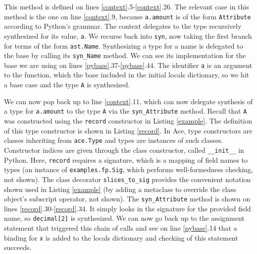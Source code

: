 {%

This method is defined on lines \ref{context}.5-\ref{context}.26. The relevant case in this method is the one on line \ref{context}.9, because \verb|a.amount| is of the form \verb|Attribute| according to Python's grammar. The context delegates to the type recursively synthesized for its value, \verb|a|. We recurse back into \verb|syn|, now taking the first branch for terms of the form \verb|ast.Name|. Synthesizing a type for a name is delegated to the base by calling its \verb|syn_Name| method. We can see its implementation for the base we are using on lines \ref{pybase}.37-\ref{pybase}.44. The identifier \verb|a| is an argument to the function, which the base included in the initial locals dictionary, so we hit a base case and the type \verb|A| is synthesized.

We can now pop back up to line \ref{context}.11, which can now delegate synthesis of a type for \verb|a.amount| to the type \verb|A| via the \verb|syn_Attribute| method. Recall that \verb|A| was constructed using the \verb|record| constructor in Listing \ref{example}. The definition of this type constructor is shown in Listing \ref{record}. In Ace, type constructors are classes inheriting from \verb|ace.Type| and types are instances of such classes. Constructor indices are given through the class constructor, called \verb|__init__| in Python. Here, \verb|record| requires a signature, which is a mapping of field names to types (an instance of \verb|examples.fp.Sig|, which performs well-formedness checking, not shown). The class decorator \verb|slices_to_sig| provides the convenient notation shown used in Listing \ref{example} (by adding a metaclass to override the class object's subscript operator, not shown). The \verb|syn_Attribute| method is shown on lines \ref{record}.30-\ref{record}.34. It simply looks in the signature for the provided field name, so \verb|decimal[2]| is synthesized. We can now go back up to the assignment statement that triggered this chain of calls and see on line \ref{pybase}.14 that a binding for \verb|x| is added to the locals dictionary and checking of this statement succeeds. 

}
